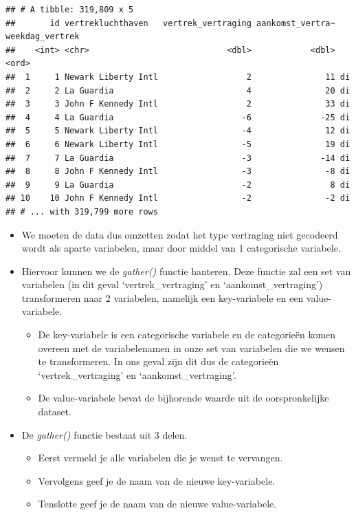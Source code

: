 \documentclass[]{tufte-book}
\providecommand{\tightlist}{%
  \setlength{\itemsep}{0pt}\setlength{\parskip}{0pt}}
\begin{document}
\begin{verbatim}
## # A tibble: 319,809 x 5
##       id vertrekluchthaven   vertrek_vertraging aankomst_vertra~ weekdag_vertrek
##    <int> <chr>                            <dbl>            <dbl> <ord>          
##  1     1 Newark Liberty Intl                  2               11 di             
##  2     2 La Guardia                           4               20 di             
##  3     3 John F Kennedy Intl                  2               33 di             
##  4     4 La Guardia                          -6              -25 di             
##  5     5 Newark Liberty Intl                 -4               12 di             
##  6     6 Newark Liberty Intl                 -5               19 di             
##  7     7 La Guardia                          -3              -14 di             
##  8     8 John F Kennedy Intl                 -3               -8 di             
##  9     9 La Guardia                          -2                8 di             
## 10    10 John F Kennedy Intl                 -2               -2 di             
## # ... with 319,799 more rows
\end{verbatim}

\begin{itemize}
\tightlist
\item
  We moeten de data dus omzetten zodat het type vertraging niet gecodeerd wordt als aparte variabelen, maar door middel van 1 categorische variabele.
\item
  Hiervoor kunnen we de \emph{gather()} functie hanteren. Deze functie zal een set van variabelen (in dit geval `vertrek\_vertraging' en `aankomst\_vertraging') transformeren naar 2 variabelen, namelijk een key-variabele en een value-variabele.

  \begin{itemize}
  \tightlist
  \item
    De key-variabele is een categorische variabele en de categorieën komen overeen met de variabelenamen in onze set van variabelen die we wensen te transformeren. In ons geval zijn dit dus de categorieën `vertrek\_vertraging' en `aankomst\_vertraging'.
  \item
    De value-variabele bevat de bijhorende waarde uit de oorspronkelijke dataset.
  \end{itemize}
\item
  De \emph{gather()} functie bestaat uit 3 delen.

  \begin{itemize}
  \tightlist
  \item
    Eerst vermeld je alle variabelen die je wenst te vervangen.
  \item
    Vervolgens geef je de naam van de nieuwe key-variabele.
  \item
    Tenslotte geef je de naam van de nieuwe value-variabele.
  \end{itemize}
\end{itemize}
\end{document}
